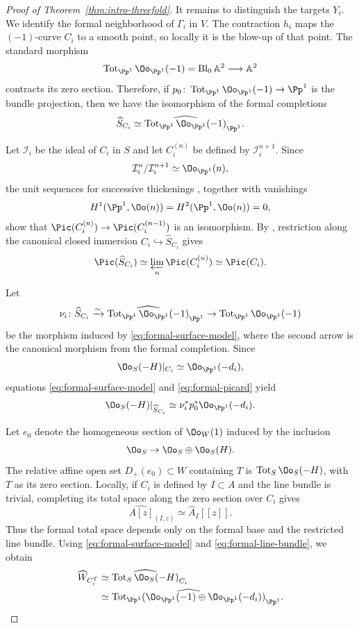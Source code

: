 \documentclass[12pt]{amsart}
\newcommand{\Tot}{\operatorname{Tot}}
\begin{document}
\begin{proof}[Proof of Theorem~\ref{thm:intro-threefold}]
It remains to distinguish the targets $Y_i$. We identify the formal neighborhood of $\Gamma_i$ in $V$. The contraction $h_i$ maps the $(-1)$-curve $C_i$ to a smooth point, so locally it is the blow-up of that point. The standard morphism
\[
 \Tot_{\Pp^1}\Oo_{\Pp^1}(-1)=\operatorname{Bl}_0\mathbb A^2\longrightarrow\mathbb A^2
\]
contracts its zero section. Therefore, if $p_0\colon\Tot_{\Pp^1}\Oo_{\Pp^1}(-1)\to\Pp^1$ is the bundle projection, then we have the isomorphism of the formal completions
\begin{equation}\label{eq:formal-surface-model}
 \widehat S_{C_i}\simeq
 \widehat{\Tot_{\Pp^1}\Oo_{\Pp^1}(-1)}_{\Pp^1}.
\end{equation}

Let $\mathcal I_i$ be the ideal of $C_i$ in $S$ and let $C_i^{(n)}$ be defined by $\mathcal I_i^{n+1}$. Since
\[
 \mathcal I_i^n/\mathcal I_i^{n+1}\simeq\Oo_{\Pp^1}(n),
\]
the unit sequences for successive thickenings \cite[III, Exercise~4.6]{Har77}, together with vanishings \[H^1(\Pp^1,\Oo(n))=H^2(\Pp^1,\Oo(n))=0,\] show that $\Pic(C_i^{(n)})\to\Pic(C_i^{(n-1)})$ is an isomorphism. By \cite[II, Exercise~9.6]{Har77}, restriction along the canonical closed immersion $C_i\hookrightarrow\widehat S_{C_i}$ gives
\begin{equation}\label{eq:formal-picard}
 \Pic(\widehat S_{C_i})\simeq
 \varprojlim_n\Pic(C_i^{(n)})\simeq\Pic(C_i).
\end{equation}

Let
\[
\nu_i\colon
\widehat S_{C_i}
\xrightarrow{\sim}
\widehat{\Tot_{\Pp^1}\Oo_{\Pp^1}(-1)}_{\Pp^1}
\to
\Tot_{\Pp^1}\Oo_{\Pp^1}(-1)
\]
be the morphism induced by \eqref{eq:formal-surface-model}, where the
second arrow is the canonical morphism from the formal completion.
Since
\[
\Oo_S(-H)|_{C_i}\simeq\Oo_{\Pp^1}(-d_i),
\]
equations \eqref{eq:formal-surface-model} and
\eqref{eq:formal-picard} yield
\begin{equation}\label{eq:formal-line-bundle}
\Oo_S(-H)|_{\widehat S_{C_i}}
\simeq
\nu_i^*p_0^*\Oo_{\Pp^1}(-d_i).
\end{equation}

Let $e_0$ denote the homogeneous section of $\Oo_W(1)$ induced by the inclusion \[\Oo_S \to \Oo_S\oplus\Oo_S(H).\] The relative affine open set $D_+(e_0)\subset W$ containing $T$ is $\Tot_S\Oo_S(-H)$, with $T$ as its zero section. Locally, if $C_i$ is defined by $I\subset A$ and the line bundle is trivial, completing its total space along the zero section over $C_i$ gives
\[
 \widehat{A[z]}_{(I,z)}\simeq\widehat A_I[[z]].
\]
Thus the formal total space depends only on the formal base and the restricted line bundle. Using \eqref{eq:formal-surface-model} and \eqref{eq:formal-line-bundle}, we obtain
\begin{align}
 \widehat W_{C_i^T}
 &\simeq \widehat{\Tot_S\Oo_S(-H)}_{C_i}\notag\\
 &\simeq
 \widehat{\Tot_{\Pp^1}
 (\Oo_{\Pp^1}(-1)\oplus\Oo_{\Pp^1}(-d_i))}_{\Pp^1}.
 \label{eq:formal-neighborhood-W}
\end{align}


\end{proof}
\end{document}
